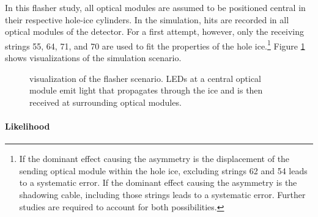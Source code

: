 In this flasher study, all optical modules are assumed to be positioned
central in their respective hole-ice cylinders. In the simulation, hits
are recorded in all optical modules of the detector. For a first
attempt, however, only the receiving strings 55, 64, 71, and 70 are used
to fit the properties of the hole
ice.\footnote{If the dominant effect causing the asymmetry is the displacement of the sending optical module within the hole ice, excluding strings 62 and 54 leads to a systematic error. If the dominant effect causing the asymmetry is the shadowing cable, including those strings leads to a systematic error. Further studies are required to account for both possibilities.}
Figure \ref{fig:Cahy7eej} shows \steamshovel visualizations of the
simulation scenario.

\begin{figure}[htbp]
  \centering
  \hfill
  \hfill
  \hfill
  \begin{minipage}[b]{0.48\textwidth}
  \end{minipage}
  \caption{\steamshovel visualization of the flasher scenario. LEDs at a central optical module emit light that propagates through the ice and is then received at surrounding optical modules.}
  \label{fig:Cahy7eej}
\end{figure}

\paragraph{Likelihood}

